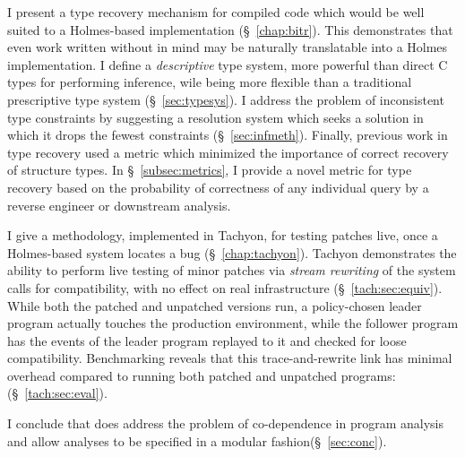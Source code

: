 I present a type recovery mechanism for compiled code which would be well suited to a Holmes-based implementation (\S~\ref{chap:bitr}).
This demonstrates that even work written without \sysname in mind may be naturally translatable into a Holmes implementation.
I define a \emph{descriptive} type system, more powerful than direct C types for performing inference, wile being more flexible than a traditional prescriptive type system (\S~\ref{sec:typesys}).
I address the problem of inconsistent type constraints by suggesting a resolution system which seeks a solution in which it drops the fewest constraints (\S~\ref{sec:infmeth}).
Finally, previous work in type recovery used a metric which minimized the importance of correct recovery of structure types.
In \S~\ref{subsec:metrics}, I provide a novel metric for type recovery based on the probability of correctness of any individual query by a reverse engineer or downstream analysis.

I give a methodology, implemented in Tachyon, for testing patches live, once a Holmes-based system locates a bug (\S~\ref{chap:tachyon}).
Tachyon demonstrates the ability to perform live testing of minor patches via \emph{stream rewriting} of the system calls for compatibility, with no effect on real infrastructure (\S~\ref{tach:sec:equiv}).
While both the patched and unpatched versions run, a policy-chosen leader program actually touches the production environment, while the follower program has the events of the leader program replayed to it and checked for loose compatibility.
Benchmarking reveals that this trace-and-rewrite link has minimal overhead compared to running both patched and unpatched programs: (\S~\ref{tach:sec:eval}).

I conclude that \sysname does address the problem of co-dependence in program analysis and allow analyses to be specified in a modular fashion(\S~\ref{sec:conc}).
